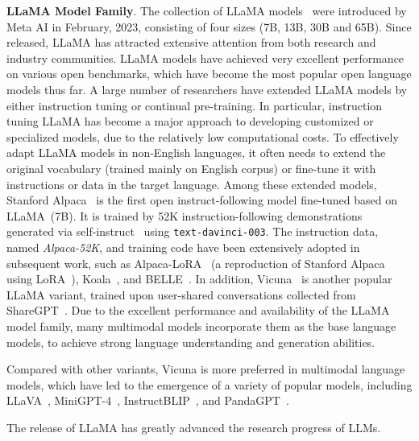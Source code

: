 \textbf{LLaMA Model Family}. The collection of LLaMA models~\cite{Touvron-arxiv-2023-LLaMA} were introduced by Meta AI in February, 2023, consisting of four sizes (7B, 13B, 30B and 65B). Since released, LLaMA has attracted extensive attention from both research and industry communities. LLaMA models have achieved very excellent performance on various open benchmarks, which have become the most popular open language models thus far. A large number of researchers have extended LLaMA models by either instruction tuning or continual pre-training. In particular, instruction tuning LLaMA has become a major approach to developing customized or specialized models, due to the relatively low computational costs. To effectively adapt LLaMA models in non-English languages, it often needs to extend the original vocabulary (trained mainly  on English corpus) or fine-tune it with instructions or data in the target language. Among these extended models,  Stanford Alpaca~\cite{Taori-github-2023-Stanford} is the first open instruct-following model fine-tuned based on LLaMA~(7B). It is trained by 52K instruction-following demonstrations generated via self-instruct~\cite{Wang-arXiv-2022-Self} using \texttt{text-davinci-003}. 
The instruction data, named \emph{Alpaca-52K}, and training code have been extensively adopted  in subsequent work, such as Alpaca-LoRA~\cite{Alpaca-LoRA} (a reproduction of Stanford Alpaca using LoRA~\cite{Hu-ICLR-2022-LoRA}), Koala~\cite{koala_blogpost_2023}, and BELLE~\cite{BELLE}. In addition, Vicuna~\cite{vicuna2023} is another popular LLaMA variant,   trained upon user-shared conversations collected from ShareGPT~\cite{ShareGPT}. Due to the excellent  performance and availability of the LLaMA model family, many multimodal models incorporate them as the base language models, to achieve strong language understanding and generation abilities. 

Compared with other variants, Vicuna is more preferred in multimodal language models, which have led to the emergence of a variety of popular models, including  LLaVA~\cite{Liu-arxiv-2023-Visual}, MiniGPT-4~\cite{Zhu-arxiv-2023-MiniGPT-4}, InstructBLIP~\cite{Dai-2023-arxiv-InstructBLIP}, and PandaGPT~\cite{su-2023-arxiv-pandagpt}. 

The release of LLaMA has greatly advanced the research progress of LLMs. 

